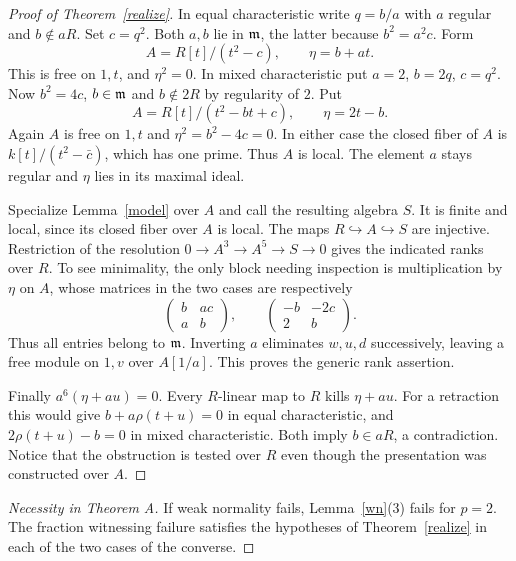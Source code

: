 \begin{proof}[Proof of Theorem~\ref{realize}]
In equal characteristic write $q=b/a$ with $a$ regular and $b\notin aR$. Set $c=q^2$. Both $a,b$ lie in $\mathfrak m$, the latter because $b^2=a^2c$. Form
\[
 A=R[t]/(t^2-c),\qquad \eta=b+at .
\]
This is free on $1,t$, and $\eta^2=0$. In mixed characteristic put $a=2$, $b=2q$, $c=q^2$. Now $b^2=4c$, $b\in\mathfrak m$ and $b\notin 2R$ by regularity of $2$. Put
\[
 A=R[t]/(t^2-bt+c),\qquad \eta=2t-b .
\]
Again $A$ is free on $1,t$ and $\eta^2=b^2-4c=0$. In either case the closed fiber of $A$ is $k[t]/(t^2-\bar c)$, which has one prime. Thus $A$ is local. The element $a$ stays regular and $\eta$ lies in its maximal ideal.

Specialize Lemma~\ref{model} over $A$ and call the resulting algebra $S$. It is finite and local, since its closed fiber over $A$ is local. The maps $R\hookrightarrow A\hookrightarrow S$ are injective. Restriction of the resolution $0\to A^3\to A^5\to S\to0$ gives the indicated ranks over $R$. To see minimality, the only block needing inspection is multiplication by $\eta$ on $A$, whose matrices in the two cases are respectively
\[
 \begin{pmatrix}b&ac\\a&b\end{pmatrix},\qquad
 \begin{pmatrix}-b&-2c\\2&b\end{pmatrix}.
\]
Thus all entries belong to $\mathfrak m$. Inverting $a$ eliminates $w,u,d$ successively, leaving a free module on $1,v$ over $A[1/a]$. This proves the generic rank assertion.

Finally $a^6(\eta+au)=0$. Every $R$-linear map to $R$ kills $\eta+au$. For a retraction this would give $b+a\rho(t+u)=0$ in equal characteristic, and $2\rho(t+u)-b=0$ in mixed characteristic. Both imply $b\in aR$, a contradiction. Notice that the obstruction is tested over $R$ even though the presentation was constructed over $A$.
\end{proof}
\begin{proof}[Necessity in Theorem A]
If weak normality fails, Lemma~\ref{wn}(3) fails for $p=2$. The fraction witnessing failure satisfies the hypotheses of Theorem~\ref{realize} in each of the two cases of the converse.
\end{proof}
